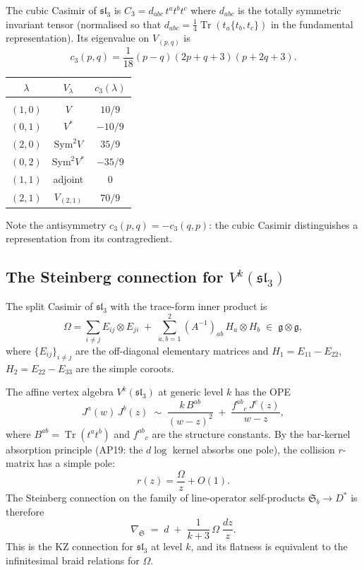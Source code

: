 \documentclass[11pt]{article}
\newcommand{\fg}{\mathfrak{g}}
\newcommand{\fsl}{\mathfrak{sl}}
\newcommand{\Tr}{\operatorname{Tr}}
\begin{document}
The cubic Casimir of $\fsl_3$ is
$C_3 = d_{abc}\, t^a t^b t^c$ where $d_{abc}$ is the totally symmetric
invariant tensor (normalised so that $d_{abc} = \frac{1}{4}\Tr(t_a\{t_b, t_c\})$
in the fundamental representation).
Its eigenvalue on $V_{(p,q)}$ is
\begin{equation}\label{eq:cubic-casimir}
  c_3(p,q)
  = \frac{1}{18}(p - q)(2p + q + 3)(p + 2q + 3).
\end{equation}

\begin{observation}
\label{obs:sl3-cubic-table}
\begin{center}
\begin{tabular}{ccc}
  $\lambda$ & $V_\lambda$ & $c_3(\lambda)$ \\[2pt]
  \hline\\[-8pt]
  $(1,0)$ & $V$ & $10/9$ \\
  $(0,1)$ & $V^*$ & $-10/9$ \\
  $(2,0)$ & $\mathrm{Sym}^2 V$ & $35/9$ \\
  $(0,2)$ & $\mathrm{Sym}^2 V^*$ & $-35/9$ \\
  $(1,1)$ & adjoint & $0$\\
  $(2,1)$ & $V_{(2,1)}$ & $70/9$ \\
\end{tabular}
\end{center}
Note the antisymmetry $c_3(p,q) = -c_3(q,p)$: the cubic
Casimir distinguishes a representation from its contragredient.
\end{observation}


\subsection{The Steinberg connection for $V^k(\fsl_3)$}
\label{subsec:sl3-steinberg}

The split Casimir of $\fsl_3$ with the trace-form inner product is
\[
  \Omega = \sum_{i \neq j} E_{ij} \otimes E_{ji}
  \;+\; \sum_{a,b=1}^{2} (A^{-1})_{ab}\, H_a \otimes H_b
  \;\in\; \fg \otimes \fg,
\]
where $\{E_{ij}\}_{i\neq j}$ are the off-diagonal elementary matrices
and $H_1 = E_{11} - E_{22}$, $H_2 = E_{22} - E_{33}$ are the
simple coroots.

The affine vertex algebra $V^k(\fsl_3)$ at generic level $k$ has
the OPE
\[
  J^a(w)\, J^b(z)
  \;\sim\;
  \frac{k\, B^{ab}}{(w-z)^2}
  \;+\;
  \frac{f^{ab}{}_c\, J^c(z)}{w-z},
\]
where $B^{ab} = \Tr(t^a t^b)$ and $f^{ab}{}_c$ are the structure
constants.  By the bar-kernel absorption principle
(AP19: the $d\log$ kernel absorbs one pole), the collision
$r$-matrix has a simple pole:
\[
  r(z) = \frac{\Omega}{z} + O(1).
\]
The Steinberg connection on the family of line-operator
self-products $\mathfrak{S}_b \to D^*$ is therefore
\begin{equation}\label{eq:sl3-steinberg}
  \nabla_{\mathfrak{S}}
  \;=\; d \;+\; \frac{1}{k+3}\,\Omega\;\frac{dz}{z}.
\end{equation}
This is the KZ connection for $\fsl_3$ at level $k$, and its
flatness is equivalent to the infinitesimal braid relations
for $\Omega$.
\end{document}
